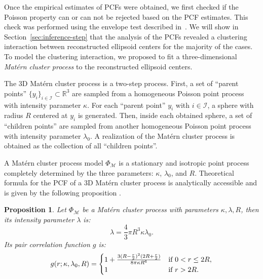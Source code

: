 \documentclass[journal]{IEEEtran}
\newtheorem{prop}{Proposition}[section]%
\begin{document}
Once the empirical estimates of PCFs were obtained, we first checked
if the Poisson property can or can not be rejected based on the PCF
estimates. This check was performed using the envelope test described
in~\cite{baddeley2014tests}. We will show in
Section~\ref{sec:inference-step} that the analysis of the PCFs
revealed a clustering interaction between reconstructed ellipsoid
centers for the majority of the cases. To model the clustering
interaction, we proposed to fit a three-dimensional \textit{Mat\'ern
  cluster process} \cite{baddeley2007spatial} to the reconstructed
ellipsoid centers.

The 3D Mat\'ern cluster process is a two-step process. First, a set of
``parent points'' $\{ y_i \}_{i \in \mathcal{I}} \subset \mathbb{R}^3$
are sampled from a homogeneous Poisson point process with intensity
parameter $\kappa$. For each ``parent point'' $y_i$ with
$i \in \mathcal{I}$, a sphere with radius $R$ centered at $y_i$ is
generated. Then, inside each obtained sphere, a set of ``children
points'' are sampled from another homogeneous Poisson point process
with intensity parameter $\lambda_0$. A realization of the Mat\'ern
cluster process is obtained as the collection of all ``children
points''.

A Mat\'ern cluster process model $\Phi_\mathcal{M}$ is a stationary
and isotropic point process completely determined by the three
parameters: $\kappa$, $\lambda_0$, and $R$. Theoretical formula for
the PCF of a 3D Mat\'ern cluster process is analytically accessible
and is given by the following proposition
\cite[p376]{illian2008statistical}.

\begin{prop}
  Let $\Phi_{\mathcal{M}}$ be a Mat\'ern cluster process with
  parameters $\kappa, \lambda, R$, then its intensity parameter
  $\lambda$ is:
  \begin{equation}
    \label{eq:matern-inten}
    \lambda = \frac{4}{3}\pi R^3\kappa \lambda_0.
  \end{equation}
  Its pair correlation function $g$ is:
  \begin{equation}
    \label{eq:matern-pcf}
    g(r; \kappa, \lambda_0, R) =
    \begin{cases}
      1 + \frac{3(R - \frac{r}{2})^2 (2R + \frac{r}{2})} {8\pi \kappa
        R^6}
      & \textnormal{if } 0 < r \leq 2R, \\
      1 & \textnormal{if } r > 2R. \\
    \end{cases}
  \end{equation}
\end{prop}
\end{document}
